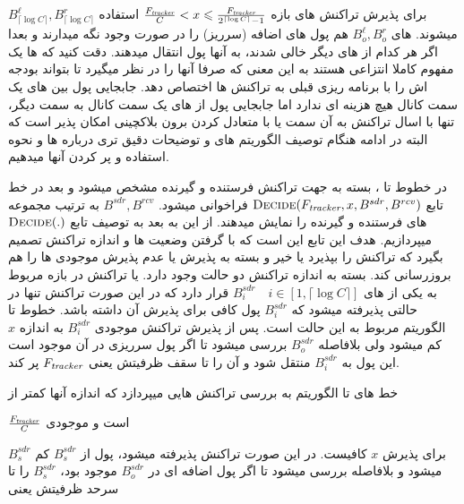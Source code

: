 $B_{\lceil\log{C}\rceil}^{\ell} ,B_{\lceil\log{C}\rceil}^{r}  $
برای پذیرش تراکنش های بازه
$\frac{F_{\textit{tracker}}}{C}<x\leqslant \frac{F_{\textit{tracker}}}{2^{\lceil\log{C}\rceil}-1}$
استفاده میشوند.
 \bucket های 
$B^{\ell}_{o},B^{r}_{o}$ 
هم پول های اضافه (سرریز) را در صورت وجود نگه میدارند و بعدا اگر هر کدام از \bucket های دیگر خالی شدند، به آنها پول انتقال میدهند.
دقت کنید که \bucket ها یک مفهوم کاملا انتزاعی هستند به این معنی که صرفا \on آنها را در نظر میگیرد تا بتواند بودجه اش را با برنامه ریزی قبلی به تراکنش ها اختصاص دهد. جابجایی پول بین \bucket های یک سمت کانال هیچ هزینه ای ندارد اما جابجایی پول از \bucket های یک سمت کانال به سمت دیگر، تنها با اسال تراکنش به آن سمت یا با متعادل کردن برون بلاکچینی امکان پذیر است که البته در ادامه هنگام توصیف الگوریتم های   و   توضیحات دقیق تری درباره \bucket ها و نحوه استفاده و پر کردن آنها میدهیم.

در خطوط   تا  ، بسته به جهت تراکنش فرستنده و گیرنده مشخص میشود و بعد در خط  تابع 
$ \Call{Decide}{\tracker ,x , B^{sdr},  B^{rcv}}$
فراخوانی میشود. 
$B^{sdr} ,  B^{rcv}$
به ترتیب مجموعه \bucket های فرستنده و گیرنده را نمایش میدهند.
از این به بعد به توصیف تابع
$ \Call{Decide}{.}$
میپردازیم. هدف این تابع این است که با گرفتن وضعیت \bucket ها و اندازه تراکنش تصمیم بگیرد که تراکنش را بپذیرد یا خیر و بسته به پذیرش یا عدم پذیرش موجودی \bucket ها را هم بروزرسانی کند.
بسته به اندازه تراکنش دو حالت وجود دارد. یا تراکنش در بازه مربوط به یکی از \bucket های 
$B_i^{sdr} \quad i \in [1,\lceil\log{C}\rceil]$
قرار دارد که در این صورت تراکنش تنها در حالتی پذیرفته میشود که \bucket
$B_i^{sdr}$
پول کافی برای پذیرش آن داشته باشد. خطوط   تا  الگوریتم    مربوط به این حالت است.
پس از پذیرش تراکنش موجودی 
$B_i^{sdr}$
 به اندازه $x$ کم میشود ولی بلافاصله \bucket
$B_o^{sdr}$
بررسی میشود تا اگر پول سرریزی در آن موجود است این پول به 
$B_i^{sdr}$
منتقل شود و آن را تا سقف ظرفیتش یعنی
$F_{\textit{tracker}}$
پر کند.

خط های  تا   الگوریتم    به بررسی تراکنش هایی میپردازد که اندازه آنها کمتر از 

$\frac{F_{\textit{tracker}}}{C}$
است و موجودی \bucket 

$B_s^{sdr}$
برای پذیرش $x$ کافیست.
در این صورت تراکنش پذیرفته میشود، پول از 
$B_s^{sdr}$
کم میشود و بلافاصله بررسی میشود تا اگر پول اضافه ای در 
$B_o^{sdr}$
موجود بود، 
$B_s^{sdr}$
را تا سرحد ظرفیتش یعنی 

